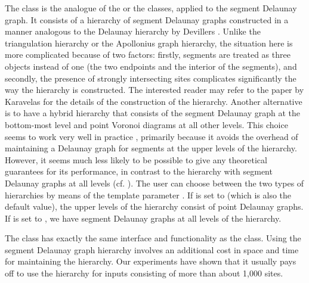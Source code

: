 The
 class is the analogue
of the  or the
 classes, applied to the segment
Delaunay graph. It consists of a hierarchy of
segment Delaunay graphs constructed in a manner analogous to the
Delaunay hierarchy by Devillers \cite{cgal:d-dh-02}. Unlike the
triangulation hierarchy or the Apollonius graph hierarchy, the
situation here is more complicated because of two factors: firstly,
segments are treated as three objects instead of one (the two
endpoints and the interior of the segments), and secondly, the
presence of strongly intersecting sites complicates significantly the
way the hierarchy is constructed. The interested reader may refer to
the paper by Karavelas \cite{cgal:k-reisv-04} for the details of the
construction of the hierarchy.
Another alternative is to have a hybrid hierarchy that consists of the
segment Delaunay graph at the bottom-most level and point Voronoi
diagrams at all other levels. This choice seems to work very well in
practice , primarily because it avoids the overhead of maintaining a
Delaunay graph for segments at the upper levels of the
hierarchy. However, it seems much less likely to be possible to give
any theoretical guarantees for its performance, in contrast to the
hierarchy with segment Delaunay graphs at all levels
(cf. \cite{cgal:k-reisv-04}). The user can choose between the two
types of hierarchies by means of the template parameter
. If  is set to  (which is also the
default value), the upper levels of the hierarchy consist of point
Delaunay graphs. If  is set to , we have segment
Delaunay graphs at all levels of the hierarchy.

The class
has exactly the same interface and functionality as the
class. Using the segment Delaunay graph hierarchy involves an
additional cost in space and time for maintaining the hierarchy. Our
experiments have shown that it usually pays off to use the hierarchy
for inputs consisting of more than about 1,000 sites. 


